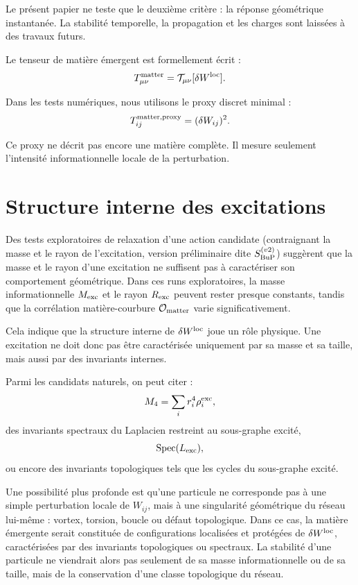 \documentclass[11pt,a4paper]{article}
\begin{document}
Le présent papier ne teste que le deuxième critère : la réponse géométrique instantanée. La stabilité temporelle, la propagation et les charges sont laissées à des travaux futurs.

Le tenseur de matière émergent est formellement écrit :
\[
T_{\mu\nu}^{\rm matter}
=
\mathcal{T}_{\mu\nu}[\delta W^{\rm loc}].
\]

Dans les tests numériques, nous utilisons le proxy discret minimal :
\[
T_{ij}^{\rm matter,proxy}
=
(\delta W_{ij})^2.
\]

Ce proxy ne décrit pas encore une matière complète. Il mesure seulement l'intensité informationnelle locale de la perturbation.

\section{Structure interne des excitations}
\label{sec:internal-structure}

Des tests exploratoires de relaxation d'une action candidate (contraignant la masse
et le rayon de l'excitation, version préliminaire dite \(S_{\rm BuP}^{(v2)}\))
suggèrent que la masse et le rayon d'une excitation ne suffisent pas à caractériser
son comportement géométrique. Dans ces runs exploratoires, la masse informationnelle
\(M_{\rm exc}\) et le rayon \(R_{\rm exc}\) peuvent rester presque constants,
tandis que la corrélation matière-courbure \(\mathcal{O}_{\rm matter}\) varie
significativement.

Cela indique que la structure interne de \(\delta W^{\rm loc}\) joue un rôle physique.
Une excitation ne doit donc pas être caractérisée uniquement par sa masse et sa taille,
mais aussi par des invariants internes.

Parmi les candidats naturels, on peut citer :
\[
M_4 = \sum_i r_i^4\rho_i^{\rm exc},
\]
des invariants spectraux du Laplacien restreint au sous-graphe excité,
\[
{\rm Spec}(L_{\rm exc}),
\]
ou encore des invariants topologiques tels que les cycles du sous-graphe excité.

Une possibilité plus profonde est qu'une particule ne corresponde pas à une
simple perturbation locale de \(W_{ij}\), mais à une singularité géométrique du
réseau lui-même : vortex, torsion, boucle ou défaut topologique. Dans ce cas, la
matière émergente serait constituée de configurations localisées et protégées de
\(\delta W^{\rm loc}\), caractérisées par des invariants topologiques ou
spectraux. La stabilité d'une particule ne viendrait alors pas seulement de sa
masse informationnelle ou de sa taille, mais de la conservation d'une classe
topologique du réseau.
\end{document}
